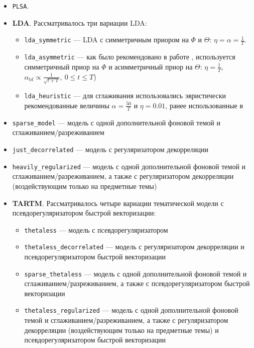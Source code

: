 \begin{itemize}
    \item \texttt{PLSA}.
    \item \textbf{LDA}. Рассматривалось три вариации LDA:
    \begin{itemize}
        \item \texttt{lda\_symmetric} --- LDA с симметричным приором на $\Phi$ и $\Theta$: $\eta = \alpha = \frac{1}{T}$.
        \item \texttt{lda\_asymmetric} --- как было рекомендовано в работе \cite{wallach2009rethinking}, используется симметричный приор на $\Phi$ и асимметричный приор на $\Theta$: $\eta=\frac{1}{T}$, $\alpha_{td}\propto\frac{1}{\sqrt{t + T}},~0\leq t \leq T$)
        \item \texttt{lda\_heuristic} --- для сглаживания использовались эвристически рекомендованные величины $\alpha=\frac{50}{T}$ и $\eta=0.01$, ранее использованные в \cite{biggers2014configuring}\cite{rosen2016mobile}
    \end{itemize}

    \item \texttt{sparse\_model} --- модель с одной дополнительной фоновой темой и сглаживанием/разреживанием
    \item \texttt{just\_decorrelated} --- модель с регуляризатором декорреляции
    \item \texttt{heavily\_regularized} --- модель с одной дополнительной фоновой темой и сглаживанием/разреживанием, а также с регуляризатором декорреляции (воздействующим только на предметные темы)
    \item \textbf{TARTM}. Рассматривалось четыре вариации тематической модели с псевдорегуляризатором быстрой векторизации:
    \begin{itemize}
        \item \texttt{thetaless} --- модель с псевдорегуляризатором
        \item \texttt{thetaless\_decorrelated} --- модель с регуляризатором декорреляции и псевдорегуляризатором быстрой векторизации
        \item \texttt{sparse\_thetaless} --- модель с одной дополнительной фоновой темой и сглаживанием/разреживанием, а также с псевдорегуляризатором быстрой векторизации
        \item \texttt{thetaless\_regularized} --- модель с одной дополнительной фоновой темой и сглаживанием/разреживанием, а также с регуляризатором декорреляции (воздействующим только на предметные темы) и псевдорегуляризатором быстрой векторизации
    \end{itemize}
\end{itemize}

